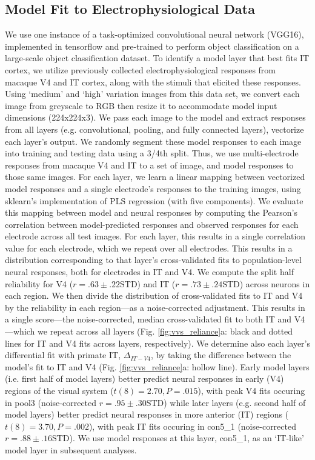 \documentclass[11pt]{article}
\begin{document}
\subsection{Model Fit to Electrophysiological Data}

We use one instance of a task-optimized convolutional neural network (VGG16\cite{simonyan2014very}), implemented in tensorflow and pre-trained to perform object classification on a large-scale object classification dataset\cite{deng2009imagenet}. To identify a model layer that best fits IT cortex, we utilize previously collected\cite{majaj2015simple} electrophysiological responses from macaque V4 and IT cortex, along with the stimuli that elicited these responses. Using `medium' and `high' variation images from this data set, we convert each image from greyscale to RGB then resize it to accommodate model input dimensions (224x224x3). We pass each image to the model and extract responses from all layers (e.g. convolutional, pooling, and fully connected layers), vectorize each layer's output. We randomly segment these model responses to each image into training and testing data using a 3/4th split. Thus, we use multi-electrode responses from macaque V4 and IT to a set of image, and model responses to those same images. For each layer, we learn a linear mapping between vectorized model responses and a single electrode's responses to the training images, using sklearn’s implementation of PLS regression (with five components). We evaluate this mapping between model and neural responses by computing the Pearson's correlation between model-predicted responses and observed responses for each electrode across all test images. For each layer, this results in a single correlation value for each electrode, which we repeat over all electrodes. This results in a distribution corresponding to that layer’s cross-validated fits to population-level neural responses, both for electrodes in IT and V4. We compute the split half reliability for V4 ($r=.63 \pm .22$STD) and IT ($r=.73 \pm .24$STD) across neurons in each region. We then divide the distribution of cross-validated fits to IT and V4 by the reliability in each region---as a noise-corrected adjustment. This results in a single score---the noise-corrected, median cross-validated fit to both IT and V4---which we repeat across all layers (Fig. \ref{fig:vvs_reliance}a: black and dotted lines for IT and V4 fits across layers, respectively). We determine also each layer’s differential fit with primate IT, $\Delta_{IT-V4}$, by taking the difference between the model’s fit to IT and V4 (Fig. \ref{fig:vvs_reliance}a: hollow line). Early model layers (i.e. first half of model layers) better predict neural responses in early (V4) regions of the visual system ($ t(8)=2.70, P = .015$), with peak V4 fits occuring in pool3 (noise-corrected $r=.95 \pm .30$STD) while later layers (e.g. second half of model layers) better predict neural responses in more anterior (IT) regions ($ t(8)=3.70, P = .002$), with peak IT fits occuring in con5\_1 (noise-corrected $r=.88 \pm .16$STD). We use model responses at this layer, con5\_1, as an `IT-like' model layer in subsequent analyses. 
\end{document}
